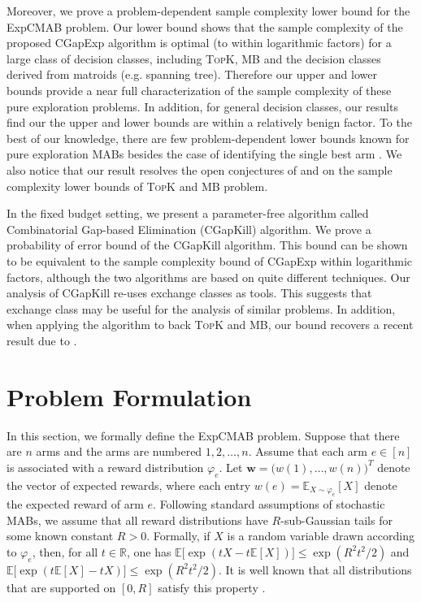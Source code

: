 \documentclass{article}
\newcommand{\Algorithm}{{\small \textsf{CGapExp}}\xspace}
\newcommand{\AlgorithmBud}{{\small \textsf{CGapKill}}\xspace}
\newcommand{\Problem}{{\small \textsf{ExpCMAB}}\xspace}
\newcommand{\Rew}{\varphi}
\newcommand{\E}{\mathbb E}
\newcommand{\RR}{\mathbb R}
\newcommand{\MultiIdent}{\textsc{TopK}\xspace}
\newcommand{\MultiBandit}{\textsc{MB}\xspace}
\renewcommand{\vec}[1]{\boldsymbol{#1}}
\begin{document}
Moreover, we prove a problem-dependent sample complexity lower bound for the \Problem problem.  
Our lower bound shows that the sample complexity of the proposed \Algorithm algorithm is optimal (to within logarithmic factors) for a large class of decision classes, including \MultiIdent, \MultiBandit and the decision classes derived from matroids (e.g. spanning tree). 
Therefore our upper and lower bounds  provide a near full characterization of the sample complexity of these pure exploration problems. 
In addition, for general decision classes, our results find our the upper and lower bounds are within a relatively benign factor. 
To the best of our knowledge, there are few problem-dependent lower bounds known for pure exploration MABs besides the case of identifying the single best arm \citep{mannor2004sample,audibert2010best}.
We also notice that our result resolves the open conjectures of \citet{kalyanakrishnan2012pac} and \citet{bubeck2013multiple} on the sample complexity lower bounds of \MultiIdent and \MultiBandit problem.

In the fixed budget setting, we present a parameter-free algorithm called Combinatorial Gap-based Elimination (\AlgorithmBud) algorithm.
We prove a probability of error bound of the \AlgorithmBud algorithm. 
This bound can be shown to be equivalent to the sample complexity bound of \Algorithm within logarithmic factors, although the two algorithms are based on quite different techniques. 
Our analysis of \AlgorithmBud re-uses exchange classes as tools. 
This suggests that exchange class may be useful for the analysis of similar problems. 
In addition, when applying the algorithm to back \MultiIdent and \MultiBandit, our bound recovers a recent result due to \citet{bubeck2013multiple}. 



\section{Problem Formulation}
In this section,  we formally define the \Problem problem.
Suppose that there are $n$ arms and the arms are numbered $1,2,\ldots,n$.
Assume that each arm $e\in[n]$ is associated with a reward distribution $\Rew_e$.
Let $\vec w = \big(w(1),\ldots, w(n)\big)^T$ denote the vector of expected rewards, where each entry $w(e)=\E_{X\sim \Rew_e}[X]$ denote the expected reward of arm $e$.
Following standard assumptions of stochastic MABs, we assume that all reward distributions have $R$-sub-Gaussian tails for some known constant $R>0$. 
Formally, if $X$ is a random variable drawn according to $\Rew_e$, then, for all $t\in \RR$, one has $\mathbb E\big[\exp(tX-t\mathbb E[X])\big] \le \exp(R^2t^2/2)$ and $\mathbb E\big[\exp(t\mathbb E[X]-tX)\big] \le \exp(R^2t^2/2)$.
It is well known that all distributions that are supported on $[0,R]$ satisfy this property \citep{pollard2000asymptopia}.
\end{document}
